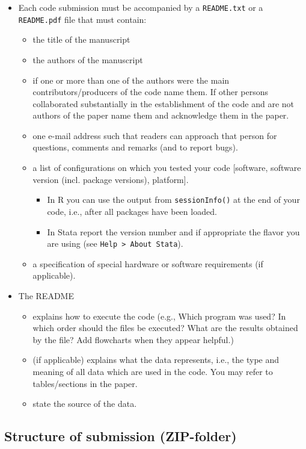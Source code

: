 \documentclass[12pt,a4paper]{article}
\begin{document}
\begin{itemize}
\item Each code submission {must} be accompanied by a \texttt{README.txt} or a
  \texttt{README.pdf} file that must contain:
  \begin{itemize}
  \item the title of the manuscript
  \item the authors of the manuscript
  \item if one or more than one of the authors were the main contributors/producers
    of the code name them. If other persons collaborated substantially in the
    establishment of the code and are not authors of the paper name them and
    acknowledge them in the paper.
  \item one e-mail address such that readers can approach that person for
    questions, comments and remarks (and to report bugs).
  \item a list of configurations on which you tested your code [software,
    software version (incl. package versions), platform].
    \begin{itemize}
    \item In \textsf{R} you can use the output from \texttt{sessionInfo()} at
      the end of your code, i.e., after all packages have been loaded.
    \item In \textsf{Stata} report the version number and if appropriate the
      flavor you are using (see \texttt{Help > About Stata}).
    \end{itemize}
  \item a specification of special hardware or software requirements (if
    applicable).
  \end{itemize}
  \item The README
  \begin{itemize}
  \item explains how to execute the code (e.g., Which program was used? In which
    order should the files be executed? What are the results obtained by the
    file? Add flowcharts when they appear helpful.)
  \item (if applicable) explains what the data represents, i.e., the type and
    meaning of all data which are used in the code. You may refer to
    tables/sections in the paper.
  \item state the source of the data.
  \end{itemize}
\end{itemize}

\subsection{Structure of submission (ZIP-folder)}\label{sec:structure}
\end{document}
